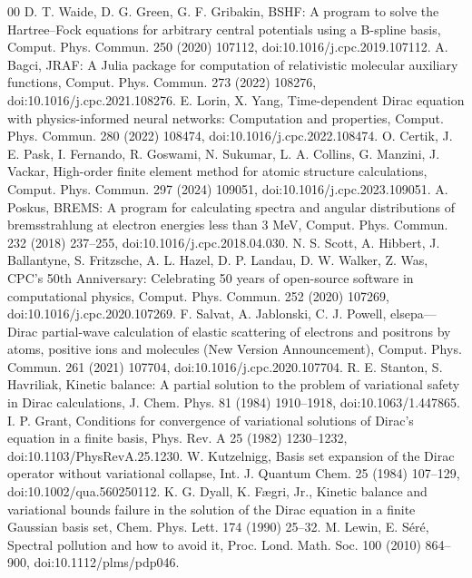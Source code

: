 \documentclass[a4paper,fleqn]{cas-dc}
\begin{document}
\begin{thebibliography}{00}
 D. T. Waide, D. G. Green, G. F. Gribakin, BSHF: A program to solve the Hartree--Fock equations for arbitrary central potentials using a B-spline basis, Comput. Phys. Commun. 250 (2020) 107112, doi:10.1016/j.cpc.2019.107112.
 A. Bagci, JRAF: A Julia package for computation of relativistic molecular auxiliary functions, Comput. Phys. Commun. 273 (2022) 108276, doi:10.1016/j.cpc.2021.108276.
 E. Lorin, X. Yang, Time-dependent Dirac equation with physics-informed neural networks: Computation and properties, Comput. Phys. Commun. 280 (2022) 108474, doi:10.1016/j.cpc.2022.108474.
 O. Certik, J. E. Pask, I. Fernando, R. Goswami, N. Sukumar, L. A. Collins, G. Manzini, J. Vackar, High-order finite element method for atomic structure calculations, Comput. Phys. Commun. 297 (2024) 109051, doi:10.1016/j.cpc.2023.109051.
 A. Poskus, BREMS: A program for calculating spectra and angular distributions of bremsstrahlung at electron energies less than 3 MeV, Comput. Phys. Commun. 232 (2018) 237--255, doi:10.1016/j.cpc.2018.04.030.
 N. S. Scott, A. Hibbert, J. Ballantyne, S. Fritzsche, A. L. Hazel, D. P. Landau, D. W. Walker, Z. Was, CPC's 50th Anniversary: Celebrating 50 years of open-source software in computational physics, Comput. Phys. Commun. 252 (2020) 107269, doi:10.1016/j.cpc.2020.107269.
 F. Salvat, A. Jablonski, C. J. Powell, elsepa---Dirac partial-wave calculation of elastic scattering of electrons and positrons by atoms, positive ions and molecules (New Version Announcement), Comput. Phys. Commun. 261 (2021) 107704, doi:10.1016/j.cpc.2020.107704.
 R. E. Stanton, S. Havriliak, Kinetic balance: A partial solution to the problem of variational safety in Dirac calculations, J. Chem. Phys. 81 (1984) 1910--1918, doi:10.1063/1.447865.
 I. P. Grant, Conditions for convergence of variational solutions of Dirac's equation in a finite basis, Phys. Rev. A 25 (1982) 1230--1232, doi:10.1103/PhysRevA.25.1230.
 W. Kutzelnigg, Basis set expansion of the Dirac operator without variational collapse, Int. J. Quantum Chem. 25 (1984) 107--129, doi:10.1002/qua.560250112.
 K. G. Dyall, K. F\ae gri, Jr., Kinetic balance and variational bounds failure in the solution of the Dirac equation in a finite Gaussian basis set, Chem. Phys. Lett. 174 (1990) 25--32.
 M. Lewin, E. S\'er\'e, Spectral pollution and how to avoid it, Proc. Lond. Math. Soc. 100 (2010) 864--900, doi:10.1112/plms/pdp046.

\end{thebibliography}
\end{document}
